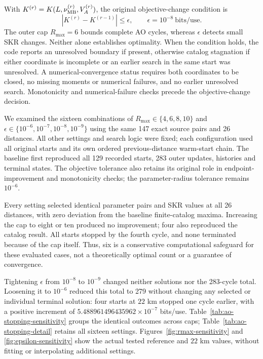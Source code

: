 With $K^{(r)}=K(L,\nu_{\rm MB}^{(r)},V_A^{(r)})$, the original objective-change
condition is
\begin{equation}
 \left|K^{(r)}-K^{(r-1)}\right|\le\epsilon,
 \qquad \epsilon=10^{-8}\ \mathrm{bits/use}.
 \label{eq:ao-stopping}
\end{equation}
The outer cap $R_{\max}=6$ bounds complete AO cycles, whereas $\epsilon$
detects small SKR changes. Neither alone establishes optimality. When the
condition holds, the code reports an unresolved boundary if present,
otherwise catalog stagnation if either coordinate is incomplete or an
earlier search in the same start was unresolved. A numerical-convergence
status requires both coordinates to be closed, no missing moments or
numerical failures, and no earlier unresolved search. Monotonicity and
numerical-failure checks precede the objective-change decision.

We examined the sixteen combinations of $R_{\max}\in\{4,6,8,10\}$ and
$\epsilon\in\{10^{-6},10^{-7},10^{-8},10^{-9}\}$ using the same 147 exact
source pairs and 26 distances. All other settings and search logic were
fixed; each configuration used all original starts and its own ordered
previous-distance warm-start chain. The baseline first reproduced all 129
recorded starts, 283 outer updates, histories and terminal states. The
objective tolerance also retains its original role in endpoint-improvement
and monotonicity checks; the parameter-radius tolerance remains $10^{-6}$.

Every setting selected identical parameter pairs and SKR values at all 26
distances, with zero deviation from the baseline finite-catalog maxima.
Increasing the cap to eight or ten produced no improvement; four also
reproduced the catalog result. All starts stopped by the fourth cycle, and
none terminated because of the cap itself. Thus, six is a conservative
computational safeguard for these evaluated cases, not a theoretically
optimal count or a guarantee of convergence.

Tightening $\epsilon$ from $10^{-8}$ to $10^{-9}$ changed neither solutions
nor the 283-cycle total. Loosening it to $10^{-6}$ reduced this total to 279
without changing any selected or individual terminal solution: four starts
at $22$ km stopped one cycle earlier, with a positive increment of
$5.488961496435962\times10^{-7}$ bits/use. Table~\ref{tab:ao-stopping-sensitivity}
groups the identical outcomes across caps; Table~\ref{tab:ao-stopping-detail}
retains all sixteen settings. Figures~\ref{fig:rmax-sensitivity} and
\ref{fig:epsilon-sensitivity} show the actual tested reference and $22$ km
values, without fitting or interpolating additional settings.

